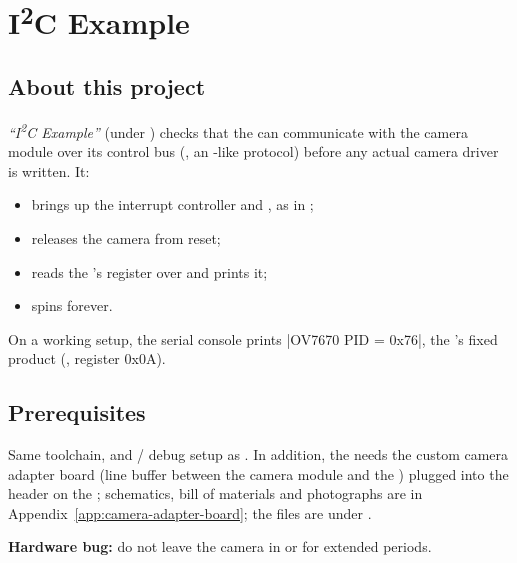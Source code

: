 \chapter{I\textsuperscript{2}C Example}
\label{chap:fpgasteel-i2c-example}

\section{About this project}
\label{sec:fpgasteel-i2c-about}

\textit{``I\textsuperscript{2}C Example''} (under ) checks that the  can communicate with the  camera module over its control bus (, an -like protocol) before any actual camera driver is written. It:

\begin{itemize}
    \item brings up the interrupt controller and , as in ;
    \item releases the camera from reset;
    \item reads the 's  register over  and prints it;
    \item spins forever.
\end{itemize}

On a working setup, the serial console prints |OV7670 PID = 0x76|, the 's fixed product  (\cite{OV7670-DS}, register 0x0A).

\section{Prerequisites}
\label{sec:fpgasteel-i2c-prerequisites}

Same toolchain,  and / debug setup as . In addition, the  needs the custom camera adapter board (line buffer between the camera module and the ) plugged into the  header on the ; schematics, bill of materials and photographs are in Appendix~\ref{app:camera-adapter-board}; the  files are under .

\begin{warningbox}
\textbf{Hardware bug:} do not leave the camera in  or  for extended periods.\footnotemark
\end{warningbox}

